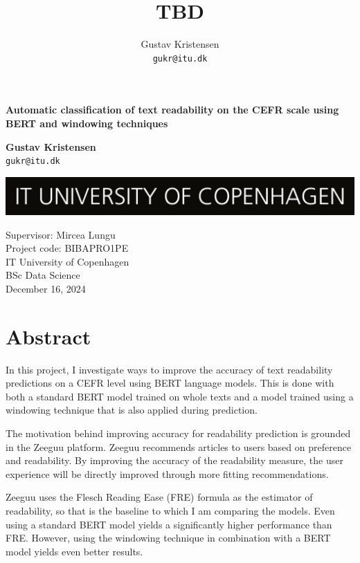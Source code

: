 \documentclass[11pt,a4paper]{article}
\title{TBD}
\author{Gustav Kristensen \\ \texttt{gukr@itu.dk}}
\begin{document}
\begin{titlepage}
  \begin{center}
    \vspace*{1cm}

    \textbf{Automatic classification of text readability on the CEFR scale using BERT and windowing techniques}

    \vspace{1cm}

    \textbf{Gustav Kristensen} \\
    \texttt{gukr@itu.dk}

    \vfill

    \includegraphics[width=\textwidth]{figures/ITU_logo_UK jpg.jpg}

    \vfill

    Supervisor: Mircea Lungu \\
    Project code: BIBAPRO1PE \\
    IT University of Copenhagen \\
    BSc Data Science \\
    December 16, 2024
  \end{center}
\end{titlepage}

\section*{Abstract}

In this project, I investigate ways to improve the accuracy of text readability
predictions on a CEFR level using BERT language models. This is done with both
a standard BERT model trained on whole texts and a model trained using
a windowing technique that is also applied during prediction.

The motivation behind improving accuracy for readability prediction is grounded
in the Zeeguu platform. Zeeguu recommends articles to users based on preference
and readability. By improving the accuracy of the readability measure, the user
experience will be directly improved through more fitting recommendations.

Zeeguu uses the Flesch Reading Ease (FRE) formula as the estimator of readability, so that is the baseline to which I am
comparing the models. Even using a standard BERT model yields a
significantly higher performance than FRE. However, using the windowing technique in combination
with a BERT model yields even better results.
\end{document}
